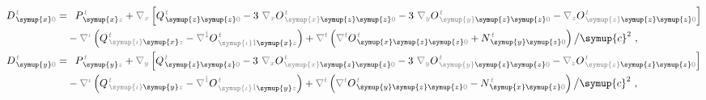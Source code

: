 \begin{subequations}
\begin{align}
	D^{\;\!\mathcolor{gray}{t}}_{\;\! \symup{x}\mathcolor{gray}{0}} = &\hphantom{+} P^{\;\!\mathcolor{gray}{t}}_{\;\! \symup{x}\mathcolor{gray}{z}} + \mathcolor{gray}{\nabla_x} \left[ Q^{\;\!\mathcolor{gray}{t}}_{\;\! \symup{z} \symup{z} \mathcolor{gray}{0}} - 3~ \mathcolor{gray}{\nabla_x} O^{\;\!\mathcolor{gray}{t}}_{\;\! \mathcolor{gray}{\symup{x}} \symup{z} \symup{z} \mathcolor{gray}{0}} - 3~ \mathcolor{gray}{\nabla_y}  O^{\;\!\mathcolor{gray}{t}}_{\;\! \mathcolor{gray}{\symup{y}} \symup{z} \symup{z}  \mathcolor{gray}{0}} - \mathcolor{gray}{\nabla_z}  O^{\;\!\mathcolor{gray}{t}}_{\;\! \mathcolor{gray}{\symup{z}} \symup{z} \symup{z} \mathcolor{gray}{0}} \right] \label{eq:D_x0=} \\ &- \mathcolor{gray}{\nabla^\iota} \left( Q^{\;\!\mathcolor{gray}{t}}_{\;\! \mathcolor{gray}{\symup{\iota}} \symup{x}\mathcolor{gray}{z}} - \mathcolor{gray}{\nabla^{\hat{1}}} O^{\;\!\mathcolor{gray}{t}}_{\;\! \mathcolor{gray}{\symup{\iota} \hat{1}} \symup{x}\mathcolor{gray}{z}} \right) + \mathcolor{gray}{\nabla^t} \left( \mathcolor{gray}{\nabla^t} O^{\;\!\mathcolor{gray}{t}}_{\;\!\symup{x} \symup{z} \symup{z} \mathcolor{gray}{0}} + N^{\;\!\mathcolor{gray}{t}}_{\;\! \symup{y} \symup{z} \mathcolor{gray}{0}} \right) \big/ \symup{c}^2 ~, \\ 
	D^{\;\!\mathcolor{gray}{t}}_{\;\! \symup{y}\mathcolor{gray}{0}} = &\hphantom{+} P^{\;\!\mathcolor{gray}{t}}_{\;\! \symup{y}\mathcolor{gray}{z}} + \mathcolor{gray}{\nabla_y} \left[ Q^{\;\!\mathcolor{gray}{t}}_{\;\! \symup{z} \symup{z} \mathcolor{gray}{0}} - 3~ \mathcolor{gray}{\nabla_x} O^{\;\!\mathcolor{gray}{t}}_{\;\! \mathcolor{gray}{\symup{x}} \symup{z} \symup{z} \mathcolor{gray}{0}} - 3~ \mathcolor{gray}{\nabla_y}  O^{\;\!\mathcolor{gray}{t}}_{\;\! \mathcolor{gray}{\symup{y}} \symup{z} \symup{z} \mathcolor{gray}{0}} - \mathcolor{gray}{\nabla_z}  O^{\;\!\mathcolor{gray}{t}}_{\;\! \mathcolor{gray}{\symup{z}} \symup{z} \symup{z} \mathcolor{gray}{0}} \right] \label{eq:D_y0=} \\ &- \mathcolor{gray}{\nabla^\iota} \left( Q^{\;\!\mathcolor{gray}{t}}_{\;\! \mathcolor{gray}{\symup{\iota}} \symup{y}\mathcolor{gray}{z}} - \mathcolor{gray}{\nabla^{\hat{1}}} O^{\;\!\mathcolor{gray}{t}}_{\;\! \mathcolor{gray}{\symup{\iota} \hat{1}} \symup{y}\mathcolor{gray}{z}} \right) + \mathcolor{gray}{\nabla^t} \left( \mathcolor{gray}{\nabla^t} O^{\;\!\mathcolor{gray}{t}}_{\;\! \symup{y} \symup{z} \symup{z} \mathcolor{gray}{0}} - N^{\;\!\mathcolor{gray}{t}}_{\;\! \symup{x} \symup{z} \mathcolor{gray}{0}} \right) \big/ \symup{c}^2 ~, \\

\end{align}
\end{subequations}
